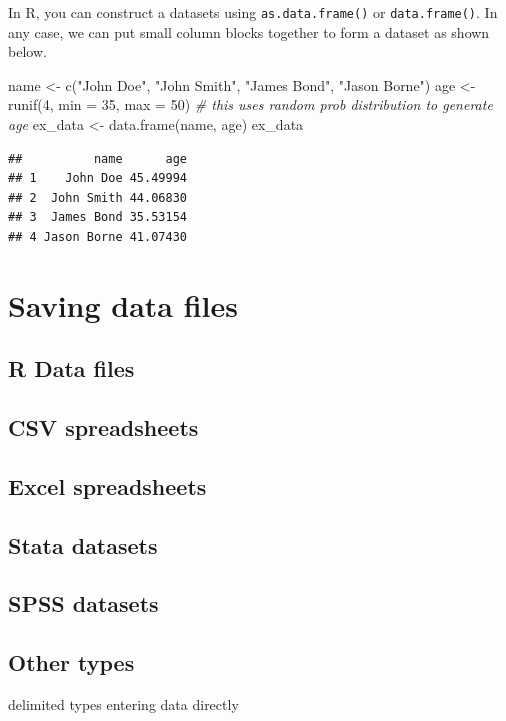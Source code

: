 \documentclass[
]{book}
\newenvironment{Shaded}{\begin{snugshade}}{\end{snugshade}}
\newcommand{\AttributeTok}[1]{\textcolor[rgb]{0.77,0.63,0.00}{#1}}
\newcommand{\CommentTok}[1]{\textcolor[rgb]{0.56,0.35,0.01}{\textit{#1}}}
\newcommand{\DecValTok}[1]{\textcolor[rgb]{0.00,0.00,0.81}{#1}}
\newcommand{\FunctionTok}[1]{\textcolor[rgb]{0.00,0.00,0.00}{#1}}
\newcommand{\NormalTok}[1]{#1}
\newcommand{\OtherTok}[1]{\textcolor[rgb]{0.56,0.35,0.01}{#1}}
\newcommand{\StringTok}[1]{\textcolor[rgb]{0.31,0.60,0.02}{#1}}
\begin{document}
In R, you can construct a datasets using \texttt{as.data.frame()} or \texttt{data.frame()}. In any case, we can put small column blocks together to form a dataset as shown below.

\begin{Shaded}
\begin{Highlighting}[]
\NormalTok{name }\OtherTok{\textless{}{-}} \FunctionTok{c}\NormalTok{(}\StringTok{"John Doe"}\NormalTok{, }\StringTok{"John Smith"}\NormalTok{, }\StringTok{"James Bond"}\NormalTok{, }\StringTok{"Jason Borne"}\NormalTok{)}
\NormalTok{age }\OtherTok{\textless{}{-}} \FunctionTok{runif}\NormalTok{(}\DecValTok{4}\NormalTok{, }\AttributeTok{min =} \DecValTok{35}\NormalTok{, }\AttributeTok{max =} \DecValTok{50}\NormalTok{) }\CommentTok{\# this uses random prob distribution to generate age}
\NormalTok{ex\_data }\OtherTok{\textless{}{-}} \FunctionTok{data.frame}\NormalTok{(name, age)}
\NormalTok{ex\_data}
\end{Highlighting}
\end{Shaded}

\begin{verbatim}
##          name      age
## 1    John Doe 45.49994
## 2  John Smith 44.06830
## 3  James Bond 35.53154
## 4 Jason Borne 41.07430
\end{verbatim}

\hypertarget{saving-data-files}{%
\section{Saving data files}\label{saving-data-files}}

\hypertarget{r-data-files}{%
\subsection{R Data files}\label{r-data-files}}

\hypertarget{csv-spreadsheets}{%
\subsection{CSV spreadsheets}\label{csv-spreadsheets}}

\hypertarget{excel-spreadsheets-1}{%
\subsection{Excel spreadsheets}\label{excel-spreadsheets-1}}

\hypertarget{stata-datasets-1}{%
\subsection{Stata datasets}\label{stata-datasets-1}}

\hypertarget{spss-datasets-1}{%
\subsection{SPSS datasets}\label{spss-datasets-1}}

\hypertarget{other-types}{%
\subsection{Other types}\label{other-types}}

delimited types
entering data directly

  
\end{document}
